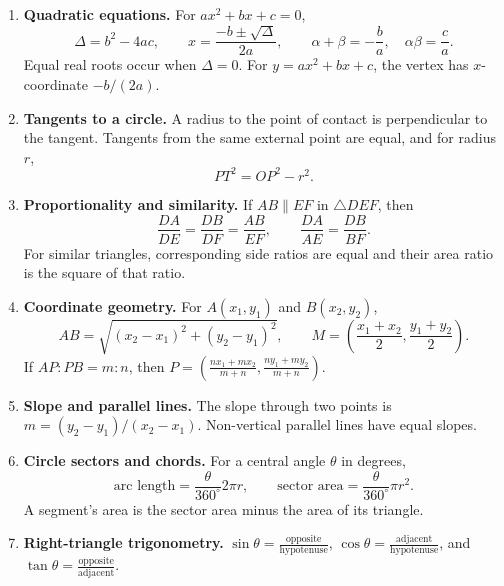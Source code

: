 \begin{enumerate}[label=\textbf{1.1.\arabic*.},ref=1.1.\arabic*]
\setlength{\itemsep}{0.35em}
\item \label{formula-1-1-1} \textbf{Quadratic equations.} For $ax^2+bx+c=0$,
\begin{equation*}\tag{1.1.1.1}
\Delta=b^2-4ac,\qquad x=\frac{-b\pm\sqrt{\Delta}}{2a},\qquad
\alpha+\beta=-\frac ba,\quad \alpha\beta=\frac ca.
\end{equation*}
Equal real roots occur when $\Delta=0$. For $y=ax^2+bx+c$, the vertex has $x$-coordinate $-b/(2a)$.
\item \label{formula-1-1-2} \textbf{Tangents to a circle.} A radius to the point of contact is perpendicular to the tangent. Tangents from the same external point are equal, and for radius $r$,
\begin{equation*}\tag{1.1.2.1}
PT^2=OP^2-r^2.
\end{equation*}
\item \label{formula-1-1-3} \textbf{Proportionality and similarity.} If $AB\parallel EF$ in $\triangle DEF$, then
\begin{equation*}\tag{1.1.3.1}
\frac{DA}{DE}=\frac{DB}{DF}=\frac{AB}{EF},\qquad
\frac{DA}{AE}=\frac{DB}{BF}.
\end{equation*}
For similar triangles, corresponding side ratios are equal and their area ratio is the square of that ratio.
\item \label{formula-1-1-4} \textbf{Coordinate geometry.} For $A(x_1,y_1)$ and $B(x_2,y_2)$,
\begin{equation*}\tag{1.1.4.1}
AB=\sqrt{(x_2-x_1)^2+(y_2-y_1)^2},\qquad
M=\left(\frac{x_1+x_2}{2},\frac{y_1+y_2}{2}\right).
\end{equation*}
If $AP:PB=m:n$, then $P=\left(\frac{nx_1+mx_2}{m+n},\frac{ny_1+my_2}{m+n}\right)$.
\item \label{formula-1-1-5} \textbf{Slope and parallel lines.} The slope through two points is $m=(y_2-y_1)/(x_2-x_1)$. Non-vertical parallel lines have equal slopes.
\item \label{formula-1-1-6} \textbf{Circle sectors and chords.} For a central angle $\theta$ in degrees,
\begin{equation*}\tag{1.1.6.1}
\text{arc length}=\frac{\theta}{360^\circ}2\pi r,\qquad
\text{sector area}=\frac{\theta}{360^\circ}\pi r^2.
\end{equation*}
A segment's area is the sector area minus the area of its triangle.
\item \label{formula-1-1-7} \textbf{Right-triangle trigonometry.} $\sin\theta=\frac{\text{opposite}}{\text{hypotenuse}}$, $\cos\theta=\frac{\text{adjacent}}{\text{hypotenuse}}$, and $\tan\theta=\frac{\text{opposite}}{\text{adjacent}}$.

\end{enumerate}
